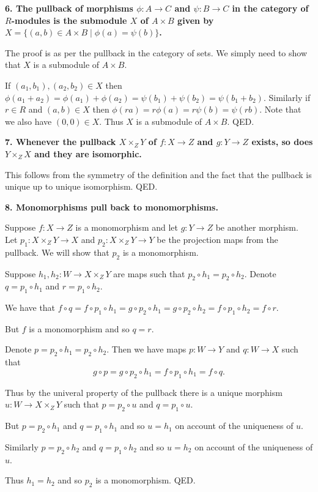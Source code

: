\documentclass[12pt]{article}
\begin{document}
\textbf{6. The pullback of morphisms $\phi : A \to C$ and $\psi : B \to C$ in the category of $R$-modules is the submodule $X$ of $A\times B$ given by $X = \{(a, b) \in A\times B \;|\; \phi(a) = \psi(b)\}$.}

The proof is as per the pullback in the category of sets. We simply need to show that $X$ is a submodule of $A\times B$.

If $(a_1, b_1), (a_2, b_2) \in X$ then $\phi(a_1 + a_2) = \phi(a_1) + \phi(a_2) = \psi(b_1) + \psi(b_2) = \psi(b_1 + b_2)$. Similarly if $r \in R$ and $(a, b) \in X$ then $\phi(ra) = r\phi(a) = r\psi(b) = \psi(rb)$. Note that we also have $(0, 0) \in X$. Thus $X$ is a submodule of $A\times B$. QED.

\textbf{7. Whenever the pullback $X\times_Z Y$ of $f : X \to Z$ and $g : Y \to Z$ exists, so does $Y\times_Z X$ and they are isomorphic.}

This follows from the symmetry of the definition and the fact that the pullback is unique up to unique isomorphism. QED.

\textbf{8. Monomorphisms pull back to monomorphisms.}

Suppose $f : X \to Z$ is a monomorphism and let $g : Y \to Z$ be another morphism. Let $p_1 : X\times_Z Y \to X$ and $p_2 : X\times_Z Y \to Y$ be the projection maps from the pullback. We will show that $p_2$ is a monomorphism.

Suppose $h_1, h_2 : W \to X\times_Z Y$ are maps such that $p_2\circ h_1 = p_2\circ h_2$. Denote $q = p_1\circ h_1$ and $r = p_1\circ h_2$.

We have that
$f\circ q = f\circ p_1\circ h_1 = g\circ p_2\circ h_1 = g\circ p_2\circ h_2 = f\circ p_1\circ h_2 = f\circ r$.

But $f$ is a monomorphism and so $q = r$.

Denote $p = p_2\circ h_1 = p_2\circ h_2$. Then we have maps $p : W \to Y$ and $q : W \to X$ such that 
$$g\circ p = g\circ p_2\circ h_1 = f\circ p_1\circ h_1 = f\circ q.$$

Thus by the univeral property of the pullback there is a unique morphism $u : W \to X\times_Z Y$ such that $p = p_2\circ u$ and $q = p_1\circ u$.

But $p = p_2\circ h_1$ and $q = p_1\circ h_1$ and so $u = h_1$ on account of the uniqueness of $u$.

Similarly $p = p_2\circ h_2$ and $q = p_1\circ h_2$ and so $u = h_2$ on account of the uniqueness of $u$.

Thus $h_1 = h_2$ and so $p_2$ is a monomorphism. QED.
\end{document}
